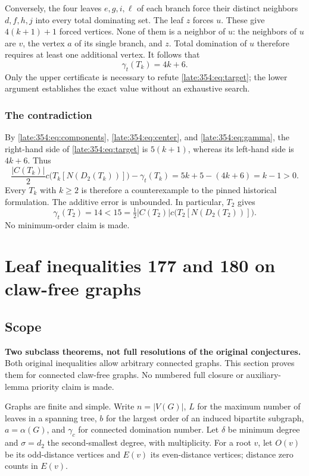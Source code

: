 \documentclass[11pt,a4paper]{article}
\theoremstyle{definition}\newtheorem{definition}[theorem]{Definition}
\theoremstyle{remark}\newtheorem{remark}[theorem]{Remark}
\begin{document}
Conversely, the four leaves $e,g,i,\ell$ of each branch force their distinct neighbors $d,f,h,j$ into every total dominating set. The leaf $z$ forces $u$. These give $4(k+1)+1$ forced vertices. None of them is a neighbor of $u$: the neighbors of $u$ are $v$, the vertex $a$ of its single branch, and $z$. Total domination of $u$ therefore requires at least one additional vertex. It follows that
\begin{equation}
\gamma_t(T_k)=4k+6.
\label{late:354:eq:gamma}
\end{equation}
Only the upper certificate is necessary to refute \eqref{late:354:eq:target}; the lower argument establishes the exact value without an exhaustive search.

\subsubsection{The contradiction}
By \eqref{late:354:eq:components}, \eqref{late:354:eq:center}, and \eqref{late:354:eq:gamma}, the right-hand side of \eqref{late:354:eq:target} is $5(k+1)$, whereas its left-hand side is $4k+6$. Thus
\[
\frac{|C(T_k)|}{2}c\bigl(T_k[N(D_2(T_k))]\bigr)-\gamma_t(T_k)
=5k+5-(4k+6)=k-1>0.
\]
Every $T_k$ with $k\ge2$ is therefore a counterexample to the pinned historical formulation. The additive error is unbounded. In particular, $T_2$ gives
\[
\boxed{\gamma_t(T_2)=14<15=\tfrac12|C(T_2)|c\bigl(T_2[N(D_2(T_2))]\bigr).}
\]
No minimum-order claim is made.


\section{Leaf inequalities 177 and 180 on claw-free graphs}\label{late:claw}

\subsection{Scope}\label{late:claw:scope}

\textbf{Two subclass theorems, not full resolutions of the original
conjectures.} Both original inequalities allow arbitrary connected
graphs. This section proves them for connected claw-free graphs. No
numbered full closure or auxiliary-lemma priority claim is made.

Graphs are finite and simple. Write \(n=|V(G)|\), \(L\) for the maximum
number of leaves in a spanning tree, \(b\) for the largest order of an
induced bipartite subgraph, \(a=\alpha(G)\), and \(\gamma_c\) for
connected domination number. Let \(\delta\) be minimum degree and
\(\sigma=d_2\) the second-smallest degree, with multiplicity. For a root
\(v\), let \(O(v)\) be its odd-distance vertices and \(E(v)\) its
even-distance vertices; distance zero counts in \(E(v)\).
\end{document}
